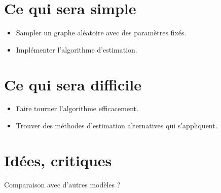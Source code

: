 \section{Ce qui sera simple}

\begin{itemize}
    \item Sampler un graphe aléatoire avec des paramètres fixés.
    \item Implémenter l'algorithme d'estimation.
\end{itemize}

\section{Ce qui sera difficile}

\begin{itemize}
    \item Faire tourner l'algorithme efficacement.
    \item Trouver des méthodes d'estimation alternatives qui s'appliquent.
\end{itemize}

\section{Idées, critiques}

Comparaison avec d'autres modèles ?